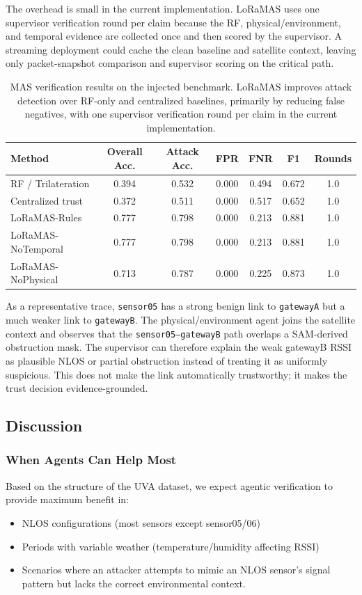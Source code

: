 \documentclass[10pt, twocolumn, letterpaper]{article}
\begin{document}
The overhead is small in the current implementation. LoRaMAS uses one supervisor verification round per claim because the RF, physical/environment, and temporal evidence are collected once and then scored by the supervisor. A streaming deployment could cache the clean baseline and satellite context, leaving only packet-snapshot comparison and supervisor scoring on the critical path.

\begin{table}[ht]
\centering
\begin{tabular}{lcccccc}
\toprule
Method & Overall Acc. & Attack Acc. & FPR & FNR & F1 & Rounds \\
\midrule
RF / Trilateration & 0.394 & 0.532 & 0.000 & 0.494 & 0.672 & 1.0\\
Centralized trust & 0.372 & 0.511 & 0.000 & 0.517 & 0.652 & 1.0\\
LoRaMAS-Rules & 0.777 & 0.798 & 0.000 & 0.213 & 0.881 & 1.0\\
LoRaMAS-NoTemporal & 0.777 & 0.798 & 0.000 & 0.213 & 0.881 & 1.0\\
LoRaMAS-NoPhysical & 0.713 & 0.787 & 0.000 & 0.225 & 0.873 & 1.0\\
\bottomrule
\end{tabular}
\caption{MAS verification results on the injected benchmark. LoRaMAS improves attack detection over RF-only and centralized baselines, primarily by reducing false negatives, with one supervisor verification round per claim in the current implementation.}
\label{tab:mas_results}
\end{table}

As a representative trace, \texttt{sensor05} has a strong benign link to \texttt{gatewayA} but a much weaker link to \texttt{gatewayB}. The physical/environment agent joins the satellite context and observes that the \texttt{sensor05--gatewayB} path overlaps a SAM-derived obstruction mask. The supervisor can therefore explain the weak gatewayB RSSI as plausible NLOS or partial obstruction instead of treating it as uniformly suspicious. This does not make the link automatically trustworthy; it makes the trust decision evidence-grounded.

\subsection{Discussion}

\subsubsection{When Agents Can Help Most}
Based on the structure of the UVA dataset, we expect agentic verification to provide maximum benefit in:
\begin{itemize}
    \item NLOS configurations (most sensors except sensor05/06)
    \item Periods with variable weather (temperature/humidity affecting RSSI)
    \item Scenarios where an attacker attempts to mimic an NLOS sensor's signal pattern but lacks the correct environmental context.
\end{itemize}
\end{document}
